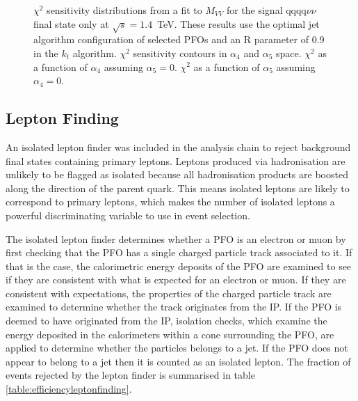 \begin{figure}[h!]
\caption[$\chi^{2}$ sensitivity distributions from a fit to $M_{VV}$ for the signal $\text{qqqq}\nu\nu$ final state only at $\sqrt{s}=1.4$~TeV.  These results use the optimal jet algorithm configuration of selected PFOs and an R parameter of 0.9 in the $k_{t}$ algorithm.  \protect{} $\chi^{2}$ sensitivity contours in $\alpha_{4}$ and $\alpha_{5}$ space.  \protect{} $\chi^{2}$ as a function of $\alpha_{4}$ assuming $\alpha_{5} = 0$.  \protect{} $\chi^{2}$ as a function of $\alpha_{5}$ assuming $\alpha_{4} = 0$.]{$\chi^{2}$ sensitivity distributions from a fit to $M_{VV}$ for the signal $\text{qqqq}\nu\nu$ final state only at $\sqrt{s}=1.4$~TeV.  These results use the optimal jet algorithm configuration of selected PFOs and an R parameter of 0.9 in the $k_{t}$ algorithm.  \protect{} $\chi^{2}$ sensitivity contours in $\alpha_{4}$ and $\alpha_{5}$ space.  \protect{} $\chi^{2}$ as a function of $\alpha_{4}$ assuming $\alpha_{5} = 0$.  \protect{} $\chi^{2}$ as a function of $\alpha_{5}$ assuming $\alpha_{4} = 0$.}
\label{fig:allchi2jetalgoideal1400GeV}
\end{figure}


\subsection{Lepton Finding} 
\label{sec:isolatedleptonfinding}
An isolated lepton finder was included in the analysis chain to reject background final states containing primary leptons.  Leptons produced via hadronisation are unlikely to be flagged as isolated because all hadronisation products are boosted along the direction of the parent quark.  This means isolated leptons are likely to correspond to primary leptons, which makes the number of isolated leptons a powerful discriminating variable to use in event selection.  

The isolated lepton finder determines whether a PFO is an electron or muon by first checking that the PFO has a single charged particle track associated to it.  If that is the case, the calorimetric energy deposits of the PFO are examined to see if they are consistent with what is expected for an electron or muon.  If they are consistent with expectations, the properties of the charged particle track are examined to determine whether the track originates from the IP.  If the PFO is deemed to have originated from the IP, isolation checks, which examine the energy deposited in the calorimeters within a cone surrounding the PFO, are applied to determine whether the particles belongs to a jet.  If the PFO does not appear to belong to a jet then it is counted as an isolated lepton.  The fraction of events rejected by the lepton finder is summarised in table \ref{table:efficiencyleptonfinding}.   


